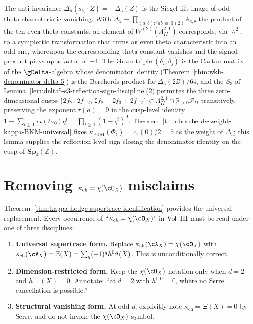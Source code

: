 \begin{remark}
\label{rem:delta5-odd-theta-anti-invariance}
The anti-invariance
$\Delta_5(s_{\delta_i}\cdot Z) = -\Delta_5(Z)$ is the Siegel-lift image
of odd-theta-characteristic vanishing. With
$\Delta_5 = \prod_{(a,b):\,{}^tab\,\equiv\,0\,(2)}\theta_{a,b}$ the
product of the ten even theta constants, an element of
$W^{(2)}(\Lambda^{2,1}_{II})$ corresponds; via $\wedge^2$; to a
symplectic transformation that turns an even theta characteristic into
an odd one, whereupon the corresponding theta constant vanishes and the
signed product picks up a factor of $-1$. The Gram triple
$(\delta_i, \delta_j)$ is the Cartan matrix of the $\gDelta$-algebra
whose denominator identity
(Theorem~\ref{thm:wkb-denominator-delta-5}) is the Borcherds product
for $\Delta_5(2Z)/64$, and the $S_3$ of
Lemma~\ref{lem:delta5-s3-reflection-sign-discipline}(2) permutes the
three zero-dimensional cusps
$\{2 f_2,\, 2 f_{-2},\, 2 f_2 - 2 f_3 + 2 f_{-2}\} \subset
\Lambda^{2,1}_{II} \cap \mathbb{R}_{>0}\mathcal{P}_{II}$
transitively, preserving the exponent $\tau(a) = 9$ in the cusp-level
identity $1 - \sum_{t \geq 1} m(t a_0) q^t = \prod_{t \geq 1}(1-q^t)^9$.
Theorem~\ref{thm:borcherds-weight-kappa-BKM-universal} fixes
$\kappa_{\mathrm{BKM}}(\Phi_1) = c_1(0)/2 = 5$ as the weight of
$\Delta_5$; this lemma supplies the reflection-level sign closing the
denominator identity on the cusp of $\mathbf{Sp}_4(\mathbb{Z})$.
\end{remark}

\section{Removing \texorpdfstring{$\kappa_{\mathrm{ch}} = \chi(\cO_X)$}{kappa-ch = chi(O-X)} misclaims}
\label{sec:cy-strat-misclaim-sweep}

Theorem~\ref{thm:kappa-hodge-supertrace-identification} provides the
universal replacement. Every occurrence of ``$\kappa_{\mathrm{ch}} = \chi(\cO_X)$''
in Vol~III must be read under one of three disciplines:

\begin{enumerate}
\item \textbf{Universal supertrace form.} Replace
$\kappa_{\mathrm{ch}}(\cA_X) = \chi(\cO_X)$ with
$\kappa_{\mathrm{ch}}(\cA_X) = \Xi(X) = \sum_q (-1)^q h^{0,q}(X)$.
This is unconditionally correct.

\item \textbf{Dimension-restricted form.} Keep the $\chi(\cO_X)$
notation only when $d = 2$ and $h^{1,0}(X) = 0$. Annotate: ``at $d = 2$
with $h^{1,0} = 0$, where no Serre cancellation is possible.''

\item \textbf{Structural vanishing form.} At odd $d$, explicitly note
$\kappa_{\mathrm{ch}} = \Xi(X) = 0$ by Serre, and do not invoke the
$\chi(\cO_X)$ symbol.
\end{enumerate}

